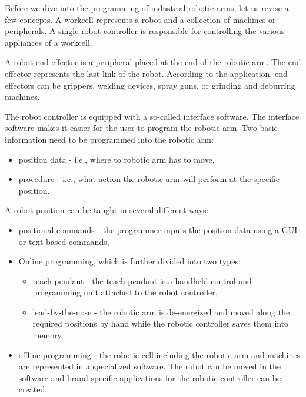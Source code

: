 Before we dive into the programming of industrial robotic arms, let us revise a few concepts.
A workcell represents a robot and a collection of machines or peripherals. A single robot controller is responsible for controlling the various appliances of a workcell.

A robot end effector is a peripheral placed at the end of the robotic arm. The end effector represents the last link of the robot. According to the application, end effectors can be grippers, welding devices, spray guns, or grinding and deburring machines.

The robot controller is equipped with a so-called interface software. The interface software makes it easier for the user to program the robotic arm.  
Two basic information need to be programmed into the robotic arm:

\begin{itemize}
    \item position data - i.e., where to robotic arm has to move,
    \item procedure - i.e., what action the robotic arm will perform at the specific position.
\end{itemize}

A robot position can be taught in several different ways:

\begin{itemize}
    \item positional commands - the programmer inputs the position data using a GUI or text-based commands,
    
    \item Online programming, which is further divided into two types:
    
    \begin{itemize}
    
    \item teach pendant - the teach pendant is a handheld control and programming unit attached to the robot controller,
    \item lead-by-the-nose - the robotic arm is de-energized and moved along the required positions by hand while the robotic controller saves them into memory,
    
    \end{itemize}
    
    \item offline programming - the robotic cell including the robotic arm and machines are represented in a specialized software. The robot can be moved in the software and brand-specific applications for the robotic controller can be created.
  

\end{itemize}

